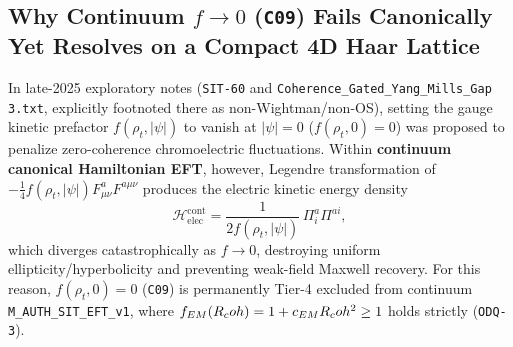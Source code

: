 \subsection{Why Continuum $f \to 0$ (\texttt{C09}) Fails Canonically Yet Resolves on a Compact 4D Haar Lattice}

In late-2025 exploratory notes (\texttt{SIT-60} and \texttt{Coherence\_\allowbreak{}Gated\_\allowbreak{}Yang\_\allowbreak{}Mills\_\allowbreak{}Gap 3.\allowbreak{}txt}, explicitly footnoted there as non-Wightman/non-OS), setting the gauge kinetic prefactor $f(\rho_t, |\psi|)$ to vanish at $|\psi| = 0$ ($f(\rho_t, 0) = 0$) was proposed to penalize zero-coherence chromoelectric fluctuations. Within \textbf{continuum canonical Hamiltonian EFT}, however, Legendre transformation of $-\frac{1}{4}f(\rho_t,|\psi|)F_{\mu\nu}^a F^{a\mu\nu}$ produces the electric kinetic energy density
\begin{equation}
\mathcal{H}_{\mathrm{elec}}^{\mathrm{cont}} = \frac{1}{2 f(\rho_t, |\psi|)}\,\Pi_i^a \Pi^{ai},
\label{eq:continuum_pi_over_f_singularity}
\end{equation}
which diverges catastrophically as $f \to 0$, destroying uniform ellipticity/hyperbolicity and preventing weak-field Maxwell recovery. For this reason, $f(\rho_t,0) = 0$ (\texttt{C09}) is permanently Tier-4 excluded from continuum \texttt{M\_AUTH\_SIT\_EFT\_v1}, where $f_{EM}(R_coh) = 1 + c_{EM}R_coh^2 \ge 1$ holds strictly (\texttt{ODQ-3}).

